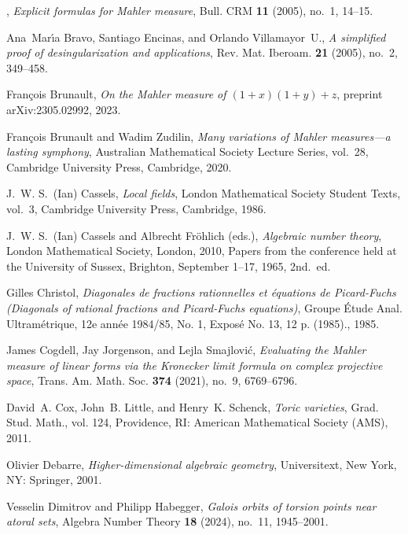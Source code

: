 \documentclass[12pt,reqno]{amsart}
\theoremstyle{definition}
\theoremstyle{plain}
\theoremstyle{definition}
\begin{document}
\begin{thebibliography}{100}
\bysame, \emph{Explicit formulas for {M}ahler measure}, Bull. CRM \textbf{11}
  (2005), no.~1, 14--15.

Ana~Mar{\'{\i}}a Bravo, Santiago Encinas, and Orlando Villamayor~U., \emph{A
  simplified proof of desingularization and applications}, Rev. Mat. Iberoam.
  \textbf{21} (2005), no.~2, 349--458.

Fran\c{c}ois Brunault, \emph{On the {M}ahler measure of $(1+x)(1+y)+z$},
  preprint arXiv:2305.02992, 2023.

Fran\c{c}ois Brunault and Wadim Zudilin, \emph{Many variations of {M}ahler
  measures---a lasting symphony}, Australian Mathematical Society Lecture
  Series, vol.~28, Cambridge University Press, Cambridge, 2020.

J.~W. S.~(Ian) Cassels, \emph{Local fields}, London Mathematical Society
  Student Texts, vol.~3, Cambridge University Press, Cambridge, 1986.

J.~W. S.~(Ian) Cassels and Albrecht Fr\"ohlich (eds.), \emph{Algebraic number
  theory}, London Mathematical Society, London, 2010, Papers from the
  conference held at the University of Sussex, Brighton, September 1--17, 1965,
  2nd.~ed.

Gilles Christol, \emph{Diagonales de fractions rationnelles et {\'e}quations de
  {Picard}-{Fuchs} ({Diagonals} of rational fractions and {Picard}-{Fuchs}
  equations)}, Groupe {\'E}tude {Anal}. {Ultram{\'e}trique}, 12e ann{\'e}e
  1984/85, {No}. 1, {Expos{\'e}} {No}. 13, 12 p. (1985)., 1985.

James Cogdell, Jay Jorgenson, and Lejla Smajlovi{\'c}, \emph{Evaluating the
  {Mahler} measure of linear forms via the {Kronecker} limit formula on complex
  projective space}, Trans. Am. Math. Soc. \textbf{374} (2021), no.~9,
  6769--6796.

David~A. Cox, John~B. Little, and Henry~K. Schenck, \emph{Toric varieties},
  Grad. Stud. Math., vol. 124, Providence, RI: American Mathematical Society
  (AMS), 2011.

Olivier Debarre, \emph{Higher-dimensional algebraic geometry}, Universitext,
  New York, NY: Springer, 2001.

Vesselin Dimitrov and Philipp Habegger, \emph{Galois orbits of torsion points
  near atoral sets}, Algebra Number Theory \textbf{18} (2024), no.~11,
  1945--2001.


\end{thebibliography}
\end{document}
